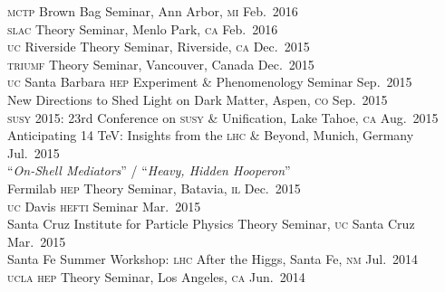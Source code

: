 \documentclass[margin,line]{resume}
\newcommand{\mytalksep}{-.1mm}
\newcommand{\mytalkskip}{2mm}
\newcommand{\scap}[1]{\textsc{\MakeLowercase{#1}}}
\begin{document}
\begin{resume}
%
\scap{MCTP} 
Brown Bag Seminar, Ann Arbor, \scap{MI}
\hfill %
Feb.~2016\vspace{\mytalksep}\\   
%
\scap{SLAC} 
Theory Seminar, Menlo Park, \scap{CA}
\hfill %
Feb.~2016\vspace{\mytalksep}\\   
%
\scap{UC} Riverside
Theory Seminar, Riverside, \scap{CA}
\hfill %
Dec.~2015\vspace{\mytalksep}\\   
%
\scap{TRIUMF}
Theory Seminar, Vancouver, Canada
\hfill %
Dec.~2015\vspace{\mytalksep}\\   
%
\scap{UC} Santa Barbara \scap{HEP} Experiment \& Phenomenology Seminar
\hfill %
Sep.~2015\vspace{\mytalksep}\\  
%
New Directions to Shed Light on Dark Matter, Aspen, \scap{CO} 
\hfill %
Sep.~2015\vspace{\mytalksep}\\   
%
\scap{SUSY} 2015: 23rd Conference on \scap{SUSY} \& Unification, Lake Tahoe, \scap{CA}
\hfill %
Aug.~2015\vspace{\mytalksep}\\   
%
Anticipating 14 TeV: Insights %
from the \textsc{lhc} \& Beyond, Munich, Germany
\hfill %
Jul.~2015\vspace{\mytalkskip}\\
%
%
%
``\emph{On-Shell Mediators}'' / 
``\emph{Heavy, Hidden Hooperon}''
\vspace{\mytalksep}\\ 
Fermilab \scap{HEP} Theory Seminar, Batavia, \scap{IL}
\hfill %
Dec.~2015\vspace{\mytalksep}\\   
%
\scap{UC} Davis \scap{HEFTI} Seminar
\hfill %
Mar.~2015\vspace{\mytalksep}\\   
%
Santa Cruz Institute for Particle Physics Theory Seminar, \scap{UC} Santa Cruz
\hfill %
Mar.~2015\vspace{\mytalksep}\\   
%
Santa Fe Summer Workshop: \scap{LHC} After the Higgs, Santa Fe, \scap{NM} 
\hfill %
Jul.~2014\vspace{\mytalksep}\\   
%
\scap{UCLA HEP} Theory Seminar, Los Angeles, \scap{CA}
\hfill %
Jun.~2014\vspace{\mytalksep}\\ 

\end{resume}
\end{document}
